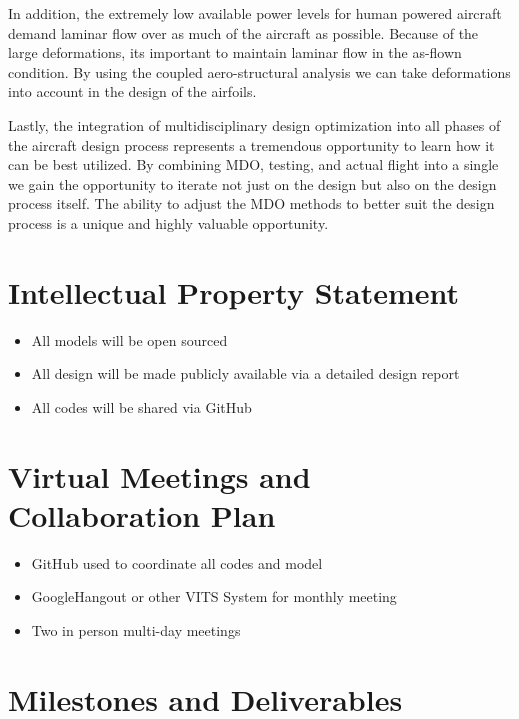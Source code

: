 \documentclass[]{aiaa-tc}
\begin{document}
    In addition, the extremely low available power levels for human powered aircraft demand laminar flow over as much of 
    the aircraft as possible. Because of the large deformations, its important to maintain laminar flow in the 
    as-flown condition. By using the coupled aero-structural analysis we can take deformations into account in the design 
    of the airfoils. 

    Lastly, the integration of multidisciplinary design optimization into all phases of the aircraft design process represents
    a tremendous opportunity to learn how it can be best utilized. By combining MDO, testing, and actual flight into a single 
    we gain the opportunity to iterate not just on the design but also on the design process itself. The ability to adjust the 
    MDO methods to better suit the design process is a unique and highly valuable opportunity. 

  
\section{Intellectual Property Statement}
    \begin{itemize}
        \item All models will be open sourced
        \item All design will be made publicly available via a detailed design report
        \item All codes will be shared via GitHub
    \end{itemize}

\section{Virtual Meetings and Collaboration Plan}
    \begin{itemize}
        \item GitHub used to coordinate all codes and model 
        \item GoogleHangout or other VITS System for monthly meeting
        \item Two in person multi-day meetings
    \end{itemize}

\section{Milestones and Deliverables}
\end{document}
